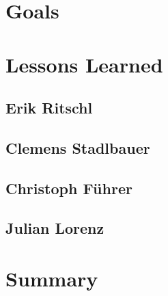 \section{Goals}

\section{Lessons Learned}

\subsection{Erik Ritschl}
\subsection{Clemens Stadlbauer}
\subsection{Christoph Führer}
\subsection{Julian Lorenz}

\section{Summary}